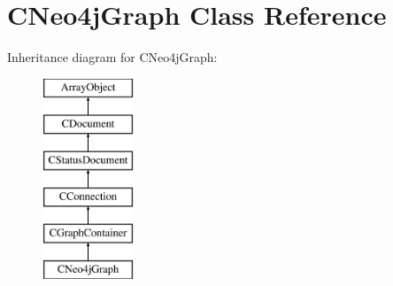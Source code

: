 \hypertarget{class_c_neo4j_graph}{\section{C\-Neo4j\-Graph Class Reference}
\label{class_c_neo4j_graph}
}
Inheritance diagram for C\-Neo4j\-Graph\-:\begin{figure}[H]
\begin{center}
\leavevmode
\includegraphics[height=6.000000cm]{class_c_neo4j_graph}
\end{center}
\end{figure}
